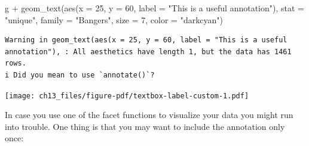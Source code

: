 \documentclass[
  letterpaper,
  DIV=11,
  numbers=noendperiod]{scrreprt}
\newenvironment{Shaded}{\begin{snugshade}}{\end{snugshade}}
\newcommand{\AttributeTok}[1]{\textcolor[rgb]{0.40,0.45,0.13}{#1}}
\newcommand{\DecValTok}[1]{\textcolor[rgb]{0.68,0.00,0.00}{#1}}
\newcommand{\FunctionTok}[1]{\textcolor[rgb]{0.28,0.35,0.67}{#1}}
\newcommand{\NormalTok}[1]{\textcolor[rgb]{0.00,0.23,0.31}{#1}}
\newcommand{\OtherTok}[1]{\textcolor[rgb]{0.00,0.23,0.31}{#1}}
\newcommand{\SpecialCharTok}[1]{\textcolor[rgb]{0.37,0.37,0.37}{#1}}
\newcommand{\StringTok}[1]{\textcolor[rgb]{0.13,0.47,0.30}{#1}}
\begin{document}
\begin{Shaded}
\begin{Highlighting}[]
\NormalTok{g }\SpecialCharTok{+}
  \FunctionTok{geom\_text}\NormalTok{(}\FunctionTok{aes}\NormalTok{(}\AttributeTok{x =} \DecValTok{25}\NormalTok{, }\AttributeTok{y =} \DecValTok{60}\NormalTok{,}
                \AttributeTok{label =} \StringTok{"This is a useful annotation"}\NormalTok{),}
            \AttributeTok{stat =} \StringTok{"unique"}\NormalTok{, }\AttributeTok{family =} \StringTok{"Bangers"}\NormalTok{,}
            \AttributeTok{size =} \DecValTok{7}\NormalTok{, }\AttributeTok{color =} \StringTok{"darkcyan"}\NormalTok{)}
\end{Highlighting}
\end{Shaded}

\begin{verbatim}
Warning in geom_text(aes(x = 25, y = 60, label = "This is a useful annotation"), : All aesthetics have length 1, but the data has 1461 rows.
i Did you mean to use `annotate()`?
\end{verbatim}

\texttt{[image: ch13\_files/figure-pdf/textbox-label-custom-1.pdf]}

In case you use one of the facet functions to visualize your data you
might run into trouble. One thing is that you may want to include the
annotation only once:

\begin{Shaded}
\end{Shaded}
\end{document}
